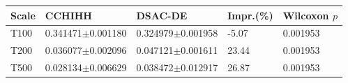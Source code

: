 \begin{tabular}{lllll}
\hline
Scale & CCHIHH & DSAC-DE & Impr.(\%) & Wilcoxon $p$ \\
\hline
T100 & 0.341471$\pm$0.001180 & 0.324979$\pm$0.001958 & -5.07 & 0.001953 \\
T200 & 0.036077$\pm$0.002096 & 0.047121$\pm$0.001611 & 23.44 & 0.001953 \\
T500 & 0.028134$\pm$0.006629 & 0.038472$\pm$0.012917 & 26.87 & 0.001953 \\
\hline
\end{tabular}